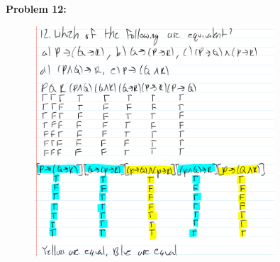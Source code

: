 \textbf{Problem 12:}
\begin{figure}[H]
    \centering
    \includegraphics[width=0.8\textwidth]{images/1.2/36.PNG}
\end{figure}